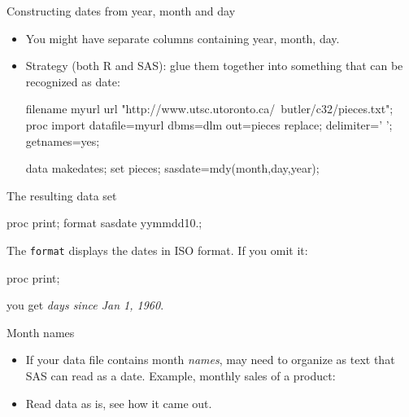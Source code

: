 \documentclass[unknownkeysallowed]{beamer}\usepackage[]{graphicx}\usepackage[]{color}
\begin{document}
\begin{frame}[fragile]{Constructing dates from year, month and day}
  
  \begin{itemize}
    
  \item You might have separate columns containing year, month, day.
  \item Strategy (both R and SAS): glue them together into something
    that can be recognized as date:
    \begin{Datastep}
filename myurl url 
  "http://www.utsc.utoronto.ca/~butler/c32/pieces.txt";
proc import
  datafile=myurl
    dbms=dlm
    out=pieces
    replace;
  delimiter=' ';
  getnames=yes;
  
data makedates;
  set pieces;
  sasdate=mdy(month,day,year);
    \end{Datastep}
    
  \end{itemize}
  
\end{frame}

\begin{frame}[fragile]{The resulting data set}

    \begin{Sascode}[store=dd]
proc print;
  format sasdate yymmdd10.;
    \end{Sascode}


The \texttt{format} displays the dates in ISO format. If you omit it:

    \begin{Sascode}[store=dda]
proc print;
    \end{Sascode}


you get \emph{days since Jan 1, 1960}.
  
  
\end{frame}


\begin{frame}[fragile]{Month names}
  
  \begin{itemize}
  \item If your data file contains month \emph{names}, may need to
    organize as text that SAS can read as a date. 
    Example, monthly sales of a product:
    
    
    
  \item Read data as is, see how it came out.
  \end{itemize}
  
\end{frame}
\end{document}
